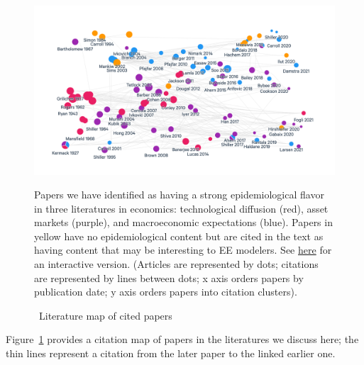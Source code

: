 \begin{figure}[!ht] \centering  %
  \caption{ ~Literature map of cited papers}
  \label{fig:graph_mixer}
  \centerline{\includegraphics[width=\textwidth]{./figures/graph_mixer.png}}
  \begin{flushleft}
    {\footnotesize Papers we have identified as having a strong epidemiological flavor in three literatures in economics: technological diffusion (red), asset markets (purple), and macroeconomic expectations (blue).  Papers in yellow have no epidemiological content but are cited in the text as having content that may be interesting to EE modelers. See \href{https://app.litmaps.co/shared/89EF6E28-98E7-4406-AA0F-BE8045A0571C}{here} for an interactive version.  (Articles are represented by dots; citations are represented by lines between dots; x axis orders papers by publication date; y axis orders papers into citation clusters).}  %
  \end{flushleft}
\end{figure}

Figure~\ref{fig:graph_mixer} provides a citation map of papers in the literatures we discuss here; the thin lines represent a citation from the later paper to the linked earlier one.

